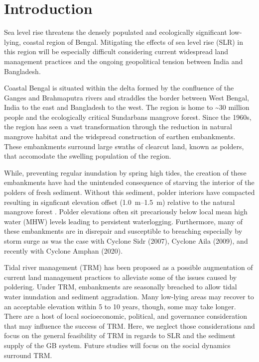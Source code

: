 \section{Introduction}

Sea level rise threatens the densely populated and ecologically significant low-lying, coastal region of Bengal. Mitigating the effects of sea level rise (SLR) in this region will be especially difficult considering current widespread land management practices and the ongoing geopolitical tension between India and Bangladesh.

Coastal Bengal is situated within the delta formed by the confluence of the Ganges and Brahmaputra rivers and straddles the border between West Bengal, India to the east and Bangladesh to the west. The region is home to \textasciitilde30 million people \citep{centerforinternationalearthscienceinformationnetwork-ciesin-columbiauniversityPopulationEstimationService2018} and the ecologically critical Sundarbans mangrove forest. Since the 1960s, the region has seen a vast transformation through the reduction in natural mangrove habitat and the widspread construction of earthen embankments. These embankments surround large swaths of clearcut land, known as polders, that accomodate the swelling population of the region.

While, preventing regular inundation by spring high tides, the creation of these embankments have had the unintended consequence of starving the interior of the polders of fresh sediment. Without this sediment, polder interiors have compacted resulting in signficant elevation offset (\SIrange{1.0}{1.5}{\meter}) relative to the natural mangrove forest \citep{auerbachFloodRiskNatural2015}. Polder elevations often sit precariously below local mean high water (MHW) levels leading to persistent waterlogging. Furthermore, many of these embankments are in disrepair and susceptible to breaching especially by storm surge as was the case with Cyclone Sidr (2007), Cyclone Aila (2009), and recently with Cyclone Amphan (2020).

Tidal river management (TRM) has been proposed as a possible augmentation of current land management practices to alleviate some of the issues caused by poldering. Under TRM, embankments are seasonally breached to allow tidal water inundation and sediment aggradation. Many low-lying areas may recover to an acceptable elevation within 5 to 10 years, though, some may take longer. There are a host of local socioeconomic, political, and governance consideration that may influence the success of TRM. Here, we neglect those considerations and focus on the general feasibility of TRM in regards to SLR and the sediment supply of the GB system. Future studies will focus on the social dynamics surround TRM.

